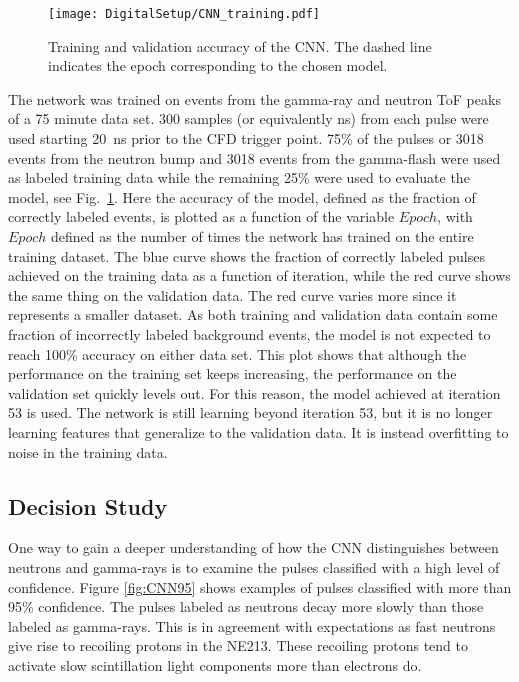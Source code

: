 \documentclass[main.tex]{subfiles}
\begin{document}
\begin{figure}[ht!]
    \centering
        \texttt{[image: DigitalSetup/CNN\_training.pdf]}
        \caption[Training and validation accuracy of the CNN.]{Training and validation accuracy of the CNN. The dashed line indicates the epoch corresponding to the chosen model.}
    \label{fig:CNN_training} 
\end{figure}

The network was trained on events from the gamma-ray and neutron ToF peaks of a 75 minute data set. 300 samples (or equivalently ns) from each pulse were used starting \SI{20}{ns} prior to the CFD trigger point. 75\% of the pulses or 3018 events from the neutron bump and 3018 events from the gamma-flash were used as labeled training data while the remaining 25\% were used to evaluate the model, see Fig.~\ref{fig:CNN_training}. Here the accuracy of the model, defined as the fraction of correctly labeled events, is plotted as a function of the variable $Epoch$, with $Epoch$ defined as the number of times the network has trained on the entire training dataset. The blue curve shows the fraction of correctly labeled pulses achieved on the training data as a function of iteration, while the red curve shows the same thing on the validation data. The red curve varies more since it represents a smaller dataset. As both training and validation data contain some fraction of incorrectly labeled background events, the model is not expected to reach 100\% accuracy on either data set. This plot shows that although the performance on the training set keeps increasing, the performance on the validation set quickly levels out. For this reason, the model achieved at iteration 53 is used. The network is still learning beyond iteration 53, but it is no longer learning features that generalize to the validation data. It is instead overfitting to noise in the training data.


\subsection{Decision Study}
One way to gain a deeper understanding of how the CNN distinguishes between neutrons and gamma-rays is to examine the pulses classified with a high level of confidence. Figure \ref{fig:CNN95} shows examples of pulses classified with more than 95\% confidence. The pulses labeled as neutrons decay more slowly than those labeled as gamma-rays. This is in agreement with expectations as fast neutrons give rise to recoiling protons in the NE213. These recoiling protons tend to activate slow scintillation light components more than electrons do. 
\end{document}
